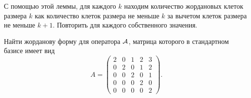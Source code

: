 С помощью этой леммы, для каждого $k$ находим количество жордановых клеток размера $k$ как количество клеток размера не меньше $k$ за вычетом клеток размера не меньше $k + 1$. Повторить для каждого собственного значения.

\begin{problem}
	Найти жорданову форму для оператора $\mathcal{A}$, матрица которого в стандартном базисе имеет вид
	\[
		A =
		\begin{pmatrix}
			2 & 0 & 1 & 2 & 3\\
			0 & 2 & 0 & 1 & 2\\
			0 & 0 & 2 & 0 & 1\\
			0 & 0 & 0 & 2 & 0\\
			0 & 0 & 0 & 0 & 2
		\end{pmatrix}.
	\]
\end{problem}

